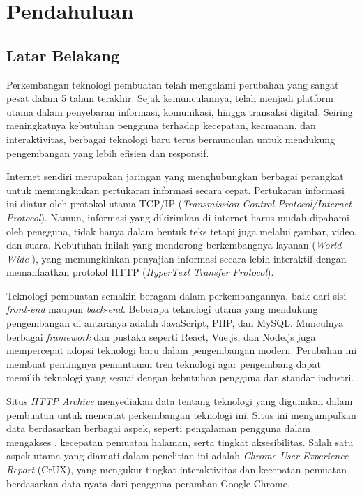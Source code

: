 \chapter{Pendahuluan}
\label{chap:intro}
   
\section{Latar Belakang}
\label{sec:label}

Perkembangan teknologi pembuatan \web telah mengalami perubahan yang sangat pesat dalam 5 tahun terakhir. Sejak kemunculannya, \web telah menjadi platform utama dalam penyebaran informasi, komunikasi, hingga transaksi digital. Seiring meningkatnya kebutuhan pengguna terhadap kecepatan, keamanan, dan interaktivitas, berbagai teknologi baru terus bermunculan untuk mendukung pengembangan \web yang lebih efisien dan responsif.

Internet sendiri merupakan jaringan yang menghubungkan berbagai perangkat untuk memungkinkan pertukaran informasi secara cepat. Pertukaran informasi ini diatur oleh protokol utama TCP/IP (\textit{Transmission Control Protocol/Internet Protocol}). Namun, informasi yang dikirimkan di internet harus mudah dipahami oleh pengguna, tidak hanya dalam bentuk teks tetapi juga melalui gambar, video, dan suara. Kebutuhan inilah yang mendorong berkembangnya layanan \web (\textit{World Wide \web}), yang memungkinkan penyajian informasi secara lebih interaktif dengan memanfaatkan protokol HTTP (\textit{HyperText Transfer Protocol}).

Teknologi pembuatan \web semakin beragam dalam perkembangannya, baik dari sisi \textit{front-end} maupun \textit{back-end}. Beberapa teknologi utama yang mendukung pengembangan \web di antaranya adalah JavaScript, PHP, dan MySQL. Munculnya berbagai \textit{framework} dan pustaka seperti React, Vue.js, dan Node.js juga mempercepat adopsi teknologi baru dalam pengembangan \web modern. Perubahan ini membuat pentingnya pemantauan tren teknologi \web agar pengembang dapat memilih teknologi yang sesuai dengan kebutuhan pengguna dan standar industri.

Situs \textit{HTTP Archive} menyediakan data tentang teknologi yang digunakan dalam pembuatan \web untuk mencatat perkembangan teknologi ini. Situs ini mengumpulkan data berdasarkan berbagai aspek, seperti pengalaman pengguna dalam mengakses \web, kecepatan pemuatan halaman, serta tingkat aksesibilitas. Salah satu aspek utama yang diamati dalam penelitian ini adalah \textit{Chrome User Experience Report} (CrUX), yang mengukur tingkat interaktivitas dan kecepatan pemuatan \web berdasarkan data nyata dari pengguna peramban Google Chrome.

